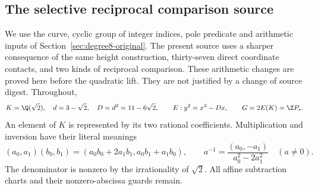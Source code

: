 \subsection{The selective reciprocal comparison source}
\label{subsec:quartic-source}
We use the curve, cyclic group of integer indices, pole predicate and
arithmetic inputs of Section~\ref{sec:degree8-original}. The present
source uses a sharper consequence of the same height construction,
thirty-seven direct coordinate contacts, and two kinds of reciprocal
comparison. These arithmetic changes are proved here before the
quadratic lift. They are not justified by a change of source digest.
Throughout,
\[
 K=\Q(\sqrt2),\quad d=3-\sqrt2,\quad D=d^2=11-6\sqrt2,
 \qquad E:y^2=x^3-Dx,\qquad G=2E(K)=\Z P_*.
\]
An element of $K$ is represented by its two rational coefficients.
Multiplication and inversion have their literal meanings
\[
 (a_0,a_1)(b_0,b_1)=(a_0b_0+2a_1b_1,a_0b_1+a_1b_0),\qquad
 a^{-1}=\frac{(a_0,-a_1)}{a_0^2-2a_1^2}\quad(a\ne0).
\]
The denominator is nonzero by the irrationality of $\sqrt2$.
All affine subtraction charts and their nonzero-abscissa guards remain.


